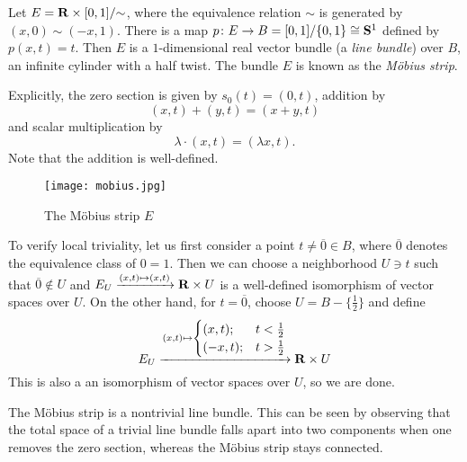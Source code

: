 \documentclass[a4paper,openany]{scrbook}
\begin{document}
\begin{example} \label{exa:mobiusstrip}
Let $E = \R \times [0,1]/\mathord\sim$, where the equivalence relation $\sim$ is generated by $(x,0) \sim (-x,1)$. There is a map $p\colon E \to B = [0,1]/\{0,1\} \cong \S^1$ defined by $p(x,t) = t$. Then $E$ is a $1$-dimensional real vector bundle (a \emph{line bundle}) over $B$, an infinite cylinder with a half twist. The bundle $E$ is known as the \emph{Möbius strip}.

Explicitly, the zero section is given by $s_0(t) = (0,t)$, addition by
\[
(x,t) + (y,t) = (x+y,t)
\]
and scalar multiplication by
\[
\lambda \cdot (x,t) = (\lambda x,t).
\]
Note that the addition is well-defined. 

\begin{figure}[h]
\begin{center}\texttt{[image: mobius.jpg]}\end{center}
\caption{The Möbius strip $E$}
\end{figure}

To verify local triviality, let us first consider a point $t \neq \overline 0 \in B$, where $\overline 0$ denotes the equivalence class of $0=1$. Then we can choose a neighborhood $U \ni t$ such that $\overline 0 \not\in U$ and $E_U \xrightarrow{(x,t) \mapsto (x,t)} \R \times U$ is a well-defined isomorphism of vector spaces over $U$. On the other hand, for $t = \overline 0$, choose $U = B-\{\frac12\}$ and define
\[
E_U \xrightarrow{(x,t) \mapsto \begin{cases} (x,t); & t<\frac12\\ (-x,t); & t>\frac12\end{cases}} \R \times U
\]
This is also a an isomorphism of vector spaces over $U$, so we are done.

The Möbius strip is a nontrivial line bundle. This can be seen by observing that the total space of a trivial line bundle falls apart into two components when one removes the zero section, whereas the Möbius strip stays connected.
\end{example}
\end{document}
